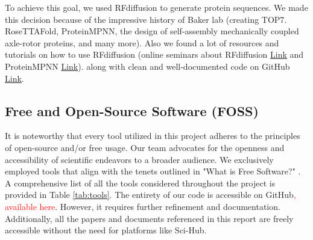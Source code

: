 \documentclass[11pt,a4paper]{article}
\begin{document}
To achieve this goal, we used RFdiffusion to generate protein 
sequences. We made this decision because of the impressive history of
Baker lab (creating TOP7. RoseTTAFold, ProteinMPNN, the design
of self-assembly mechanically coupled axle-rotor proteins, and many more).
Also we found a lot of resources and tutorials on how to use RFdiffusion (online seminars about RFdiffusion
\href{https://www.youtube.com/watch?v=wIHwHDt2NoI}{Link} and ProteinMPNN
\href{https://youtu.be/aVQQuoToTJA?si=PnQvJluY3ZPHo4TO}{Link}).
along with clean and well-documented code on GitHub \href{https://github.com/RosettaCommons/RFdiffusion}{Link}.

\subsection{Free and Open-Source Software (FOSS)}

It is noteworthy that every tool utilized in this project adheres to the principles of open-source and/or free usage. Our team advocates for the openness and accessibility of scientific endeavors to a broader audience. We exclusively employed tools that align with the tenets outlined in "What is Free Software?" \cite{gun_foss}. A comprehensive list of all the tools considered throughout the project is provided in Table \ref{tab:tools}.
The entirety of our code is accessible on GitHub\textcolor{red}{, available here}. However, it requires further refinement and documentation.
Additionally, all the papers and documents referenced in this report are freely accessible without the need for platforms like Sci-Hub.
\end{document}
